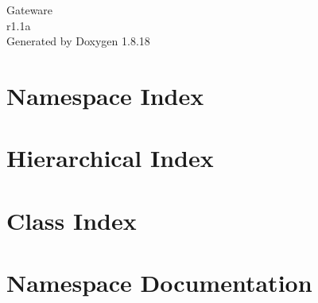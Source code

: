 \let\mypdfximage\pdfximage\def\pdfximage{\immediate\mypdfximage}\documentclass[twoside]{book}
\newcommand{\+}{\discretionary{\mbox{\scriptsize$\hookleftarrow$}}{}{}}
\newcommand{\clearemptydoublepage}{%
  \newpage{\pagestyle{empty}\cleardoublepage}%
}
\begin{document}
\hypersetup{pageanchor=false,
             bookmarksnumbered=true,
             pdfencoding=unicode
            }
\begin{titlepage}
\vspace*{7cm}
\begin{center}%
{\Large Gateware \\[1ex]\large r1.\+1a }\\
\vspace*{1cm}
{\large Generated by Doxygen 1.8.18}\\
\end{center}
\end{titlepage}
\clearemptydoublepage
{}
\tableofcontents
\clearemptydoublepage
{}
\hypersetup{pageanchor=true}

\chapter{Namespace Index}

\chapter{Hierarchical Index}

\chapter{Class Index}

\chapter{Namespace Documentation}







\end{document}
